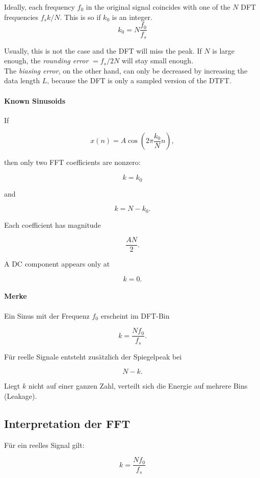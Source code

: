 Ideally, each frequency $f_0$ in the original signal coincides with one
of the $N$ DFT frequencies $f_s k / N$. This is so if $k_0$ is an integer.
\begin{equation*}
	k_0 = N \frac{f_0}{f_s}
\end{equation*}

Usually, this is not the case and the DFT will miss the peak. If $N$ is large
enough, the \emph{rounding error} $= f_s / 2N$ will stay small enough. \\

The \emph{biasing error}, on the other hand, can only be decreased by
increasing the data length $L$, because the DFT is only a sampled version
of the DTFT.
\paragraph{Known Sinusoids}

If

\[
x(n)=A\cos\left(2\pi\frac{k_0}{N}n\right),
\]

then only two FFT coefficients are nonzero:

\[
k=k_0
\]

and

\[
k=N-k_0.
\]

Each coefficient has magnitude

\[
\frac{AN}{2}.
\]

A DC component appears only at

\[
k=0.
\]

\paragraph{Merke}

Ein Sinus mit der Frequenz \(f_0\) erscheint im DFT-Bin

\[
k=\frac{Nf_0}{f_s}.
\]

Für reelle Signale entsteht zusätzlich der Spiegelpeak bei

\[
N-k.
\]

Liegt \(k\) nicht auf einer ganzen Zahl, verteilt sich die Energie auf mehrere Bins
(Leakage).

\subsection{Interpretation der FFT}

Für ein reelles Signal gilt:

\[
k=\frac{Nf_0}{f_s}
\]

